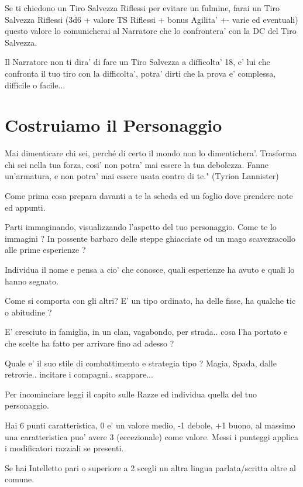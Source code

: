 \documentclass[a4paper,11pt,twoside,openany]{dndbook}
\begin{document}
Se ti chiedono un Tiro Salvezza Riflessi per evitare un fulmine, farai un Tiro Salvezza Riflessi (3d6 + valore TS Riflessi + bonus Agilita' +- varie ed eventuali) questo valore lo comunicherai al Narratore che lo confrontera' con la DC del Tiro Salvezza.

Il Narratore non ti dira' di fare un Tiro Salvezza a difficolta' 18, e' lui che confronta il tuo tiro con la difficolta', potra' dirti che la prova e' complessa, difficile o facile...


\pagebreak

\section{Costruiamo il Personaggio}

\label{costruiamo-il-personaggio}
\begin{quotebox}
Mai dimenticare chi sei, perché di certo il mondo non lo dimentichera'.
Trasforma chi sei nella tua forza, cosi' non potra' mai essere la tua
debolezza. Fanne un'armatura, e non potra' mai essere usata contro
di te." (Tyrion Lannister)
\end{quotebox}
	
Come prima cosa prepara davanti a te la scheda ed un foglio dove prendere note ed appunti.

Parti immaginando, visualizzando l'aspetto del tuo personaggio. Come te lo immagini ? In possente barbaro delle steppe ghiacciate od un mago scavezzacollo alle prime esperienze ?

Individua il nome e pensa a cio' che conosce, quali esperienze ha avuto e quali lo hanno segnato.

Come si comporta con gli altri? E' un tipo ordinato, ha delle fisse, ha qualche tic o abitudine ?

E' cresciuto in famiglia, in un clan, vagabondo, per strada.. cosa l'ha portato e che scelte ha fatto per arrivare fino ad adesso ?

Quale e' il suo stile di combattimento e strategia tipo ? Magia, Spada, dalle retrovie.. incitare i compagni.. scappare...

Per incominciare leggi il capito sulle Razze ed individua quella del tuo personaggio.

Hai 6 punti caratteristica, 0 e' un valore medio, -1 debole, +1 buono, al massimo una caratteristica puo' avere 3 (eccezionale) come valore. Messi i punteggi applica i modificatori razziali se presenti.

Se hai Intelletto pari o superiore a 2 scegli un altra lingua parlata/scritta oltre al comune.
\end{document}
